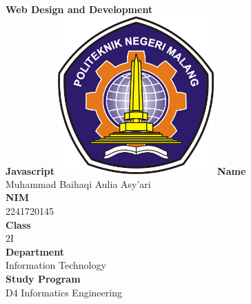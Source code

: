 \documentclass[12pt,titlepage]{article}
\newcommand{\vSubject}{Web Design and Development}
\newcommand{\vSubtitle}{Javascript}
\newcommand{\vName}{Muhammad Baihaqi Aulia Asy'ari}
\newcommand{\vNIM}{2241720145}
\newcommand{\vClass}{2I}
\newcommand{\vDepartment}{Information Technology}
\newcommand{\vStudyProgram}{D4 Informatics Engineering}
\begin{document}
\begin{titlepage}
    \centering
    \vfill
    {\bfseries\LARGE
        \vSubject\\
        \vskip0.25cm
        \vSubtitle
    }
    \vfill
    \includegraphics[width=6cm]{images/polinema-logo.png}
    \vfill
    {
        \textbf{Name}\\
        \vName\\
        \vskip0.5cm
        \textbf{NIM}\\
        \vNIM\\
        \vskip0.5cm
        \textbf{Class}\\
        \vClass\\
        \vskip0.5cm
        \textbf{Department}\\
        \vDepartment\\
        \vskip0.5cm
        \textbf{Study Program}\\
        \vStudyProgram
    }
\end{titlepage}

\newpage
\end{document}
